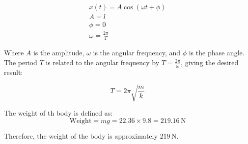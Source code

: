 \documentclass[journal,12pt,twocolumn]{IEEEtran}
\theoremstyle{remark}
\begin{document}
\begin{align}
x(t) = A\cos(\omega t + \phi) \\
A = l \\
\phi = 0 \\
\omega = \frac{2\pi}{T} 
\end{align}

Where \(A\) is the amplitude, \(\omega\) is the angular frequency, and \(\phi\) is the phase angle. The period \(T\) is related to the angular frequency by \(T = \frac{2\pi}{\omega}\), giving the desired result:

\begin{equation}
T = 2\pi\sqrt{\frac{m}{k}}
\end{equation}


The weight of th body is defined as:
\begin{equation}
\text{Weight} = mg = 22.36 \times 9.8 = 219.16 \, \text{N}
\end{equation}

Therefore, the weight of the body is approximately \(219 \, \text{N}\).
	
\end{document}
